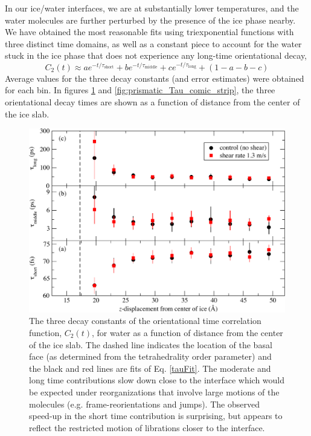 In our ice/water interfaces, we are at substantially lower
temperatures, and the water molecules are further perturbed by the
presence of the ice phase nearby.  We have obtained the most
reasonable fits using triexponential functions with three distinct
time domains, as well as a constant piece to account for the water
stuck in the ice phase that does not experience any long-time
orientational decay,
\begin{equation}
C_{2}(t) \approx a e^{-t/\tau_\mathrm{short}} + b e^{-t/\tau_\mathrm{middle}} + c
e^{-t/\tau_\mathrm{long}} + (1-a-b-c)
\end{equation}
Average values for the three decay constants (and error estimates)
were obtained for each bin. In figures \ref{fig:basal_Tau_comic_strip}
and \ref{fig:prismatic_Tau_comic_strip}, the three orientational decay
times are shown as a function of distance from the center of the ice
slab.

\begin{figure}
\includegraphics[width=\linewidth]{Figures/basal_Tau_comic_strip}
\caption{\label{fig:basal_Tau_comic_strip} The three decay constants
  of the orientational time correlation function, $C_2(t)$, for water
  as a function of distance from the center of the ice slab.  The
  dashed line indicates the location of the basal face (as determined
  from the tetrahedrality order parameter) and the black and red lines
  are fits of Eq. \ref{tauFit}.  The moderate and long
  time contributions slow down close to the interface which would be
  expected under reorganizations that involve large motions of the
  molecules (e.g. frame-reorientations and jumps).  The observed
  speed-up in the short time contribution is surprising, but appears
  to reflect the restricted motion of librations closer to the
  interface.}
\end{figure}

